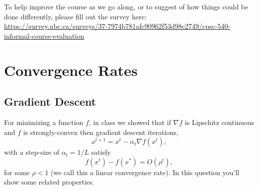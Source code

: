 \documentclass{article}
\begin{document}
To help improve the course as we go along, or to suggest of how things could be done differently, please fill out the survey here:\\
\url{https://survey.ubc.ca/surveys/37-7974b781afc90962f53d98c2749/cpsc-540-informal-course-evaluation}

\section{Convergence Rates}

\subsection{Gradient Descent}

For minimizing a function $f$, in class we showed that if $\nabla f$ is Lipschitz continuous and $f$ is strongly-convex then gradient descent iterations,
\[
x^{t+1} = x^t - \alpha_t\nabla f(x^t),
\] 
with a step-size of $\alpha_t = 1/L$ satisfy
\[
f(x^t) - f(x^*) = O(\rho^t),
\]
for some $\rho < 1$ (we call this a linear convergence rate).
In this question you'll show some related properties.
\end{document}
